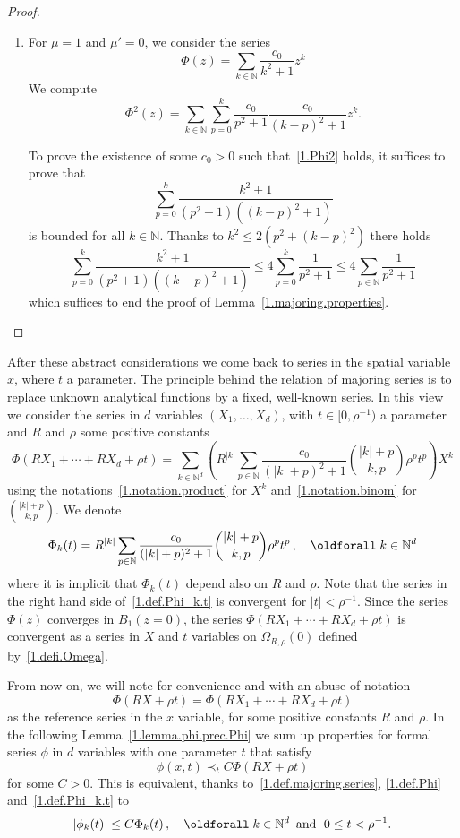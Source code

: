 \documentclass[10pt]{amsart}
\theoremstyle{definition}
\theoremstyle{plain}
\newcommand*\N{{\mathbb N}}
\newcommand*\dsp{\displaystyle}
\renewcommand*{\forall}{\mathrel{\oldforall}}
\begin{document}
\begin{proof}
\begin{enumerate}
\item For $\mu=1$ and $\mu'=0$, we consider the series
\[
\Phi(z) = \sum_{k\in\N} \frac{\dsp c_0}{\dsp k^2+1} z^{k}
\]
We compute
\[
\Phi^2(z) = \sum_{k\in\N} \sum_{p=0}^{k} \frac{\dsp c_0}{\dsp p^2+1}\frac{\dsp c_0}{\dsp (k-p)^2+1} z^{k}.
\]


To prove the existence of some $c_0 >0$ such that~\eqref{1.Phi2} holds, it suffices to prove that
\[
\sum_{p=0}^{k} \frac{\dsp k^2+1}{\dsp (p^2+1)((k-p)^2+1) }
\]
 is bounded for all $k\in\N$. Thanks to $k^2 \leq 2(p^2 + (k-p)^2) $ there holds
\[
\sum_{p=0}^{k} \frac{\dsp k^2+1}{\dsp (p^2+1)((k-p)^2+1) } \leq 4 \sum_{p=0}^{k} \frac{\dsp 1}{\dsp p^2+1} \leq 4\sum_{p\in\N} \frac{\dsp 1}{\dsp p^2+1}
\]
which suffices to end the proof of Lemma~\ref{1.majoring.properties}.\qedhere
\end{enumerate}
\end{proof}


After these abstract considerations we come back to series in the spatial variable $x$, where $t$ a parameter. The principle behind the relation of majoring series is to replace unknown analytical functions by a fixed, well-known series. In this view we consider the series in $d$ variables $(X_1, \ldots, X_d)$, with $t\in[0,\rho^{-1})$ a parameter and $R$ and $\rho$ some positive constants
\begin{equation}\label{1.def.Phi}
\Phi(RX_1+\cdots+RX_d+\rho t) = \sum_{k\in\N^{d}} \left(R^{|k|}\sum_{p\in\N} \frac{c_0}{(|k|+p)^2+1} \binom{|k|+p}{k,p} \rho^p t^p \right) X^{k}
\end{equation}
using the notations~\eqref{1.notation.product} for $X^{k}$ and~\eqref{1.notation.binom} for $\binom{|k|+p}{k,p}$. We denote
\begin{equation}\label{1.def.Phi_k.t}
\Phi_{k}(t) = R^{|k|}\sum_{p\in\N} \frac{c_0}{(|k|+p)^2+1} \binom{|k|+p}{k,p} \rho^p t^p\,,\quad\forall k\in\N^{d}
\end{equation}
where it is implicit that $\Phi_{k}(t)$ depend also on $R$ and $\rho$. Note that the series in the right hand side of~\eqref{1.def.Phi_k.t} is convergent for $|t| <\rho^{-1}$. Since the series $\Phi(z)$ converges in $B_1(z=0)$, the series $\Phi(RX_1+\cdots+RX_d+\rho t)$ is convergent as a series in $X$ and $t$ variables on $\Omega_{R,\rho}(0)$ defined by~\eqref{1.defi.Omega}.

From now on, we will note for convenience and with an abuse of notation
\begin{equation}
\Phi(RX+\rho t) = \Phi(RX_1+\cdots+RX_d+\rho t)
\end{equation}
as the reference series in the $x$ variable, for some positive constants $R$ and $\rho$. In the following Lemma~\ref{1.lemma.phi.prec.Phi} we sum up properties for formal series $\phi$ in $d$ variables with one parameter $t$ that satisfy
\[
\phi(x,t) \prec_{t} C \Phi(R X + \rho t)
\]
for some $C>0$. This is equivalent, thanks to~\eqref{1.def.majoring.series}, \eqref{1.def.Phi} and~\eqref{1.def.Phi_k.t} to
\begin{equation}\label{1.def.maj}
|\phi_{k}(t)| \leq C \Phi_{k}(t)\,, \quad \forall k \in\N^{d} \, \text{ and }\; 0\leq t < \rho^{-1}.
\end{equation}
\end{document}
